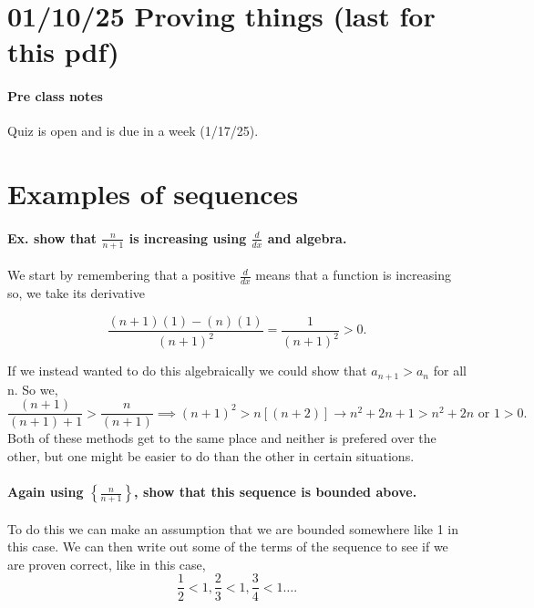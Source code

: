 \section*{01/10/25 Proving things (last for this pdf)}%
\paragraph{Pre class notes}%
Quiz is open and is due in a week (1/17/25).

\section{Examples of sequences}%
\label{sec:Examples of sequences}

\paragraph{Ex. show that $ \frac{ n }{ n+1 }  $ is increasing using $ \frac{ d }{ dx }  $ and algebra. \\}

 We start by remembering that a positive $ \frac{ d }{ dx }  $ means that a function is increasing so, we take its derivative

 \[
 \frac{ \left( n+1 \right) \left( 1 \right) -\left( n \right) \left( 1 \right)  }{ \left( n+1 \right) ^2 } = \frac{ 1 }{ \left( n+1 \right) ^2 } >0
 .\] 

If we instead wanted to do this algebraically we could show that $ a_{ n+1 }>a_n $ for all n. So we,
\[
\frac{ \left( n+1 \right)  }{ \left( n+1 \right) +1 }>\frac{ n }{ \left( n+1 \right)  } \implies \left( n+1 \right) ^2 > n\left[ \left( n+2 \right)  \right] \to n^2+2n+1> n^2+2n \text{ or } 1>0
.\] 
Both of these methods get to the same place and neither is prefered over the other, but one might be easier to do than the other in certain situations.

\paragraph{Again using $ \left\{ \frac{ n }{ n+1 }  \right\}  $, show that this sequence is bounded above. \\}

To do this we can make an assumption that we are bounded somewhere like 1 in this case. We can then write out some of the terms of the sequence to see if we are proven correct, like in this case,
\[
\frac{ 1 }{ 2 } <1, \frac{ 2 }{ 3 } <1, \frac{ 3 }{ 4 } <1 \ldots
.\] 

